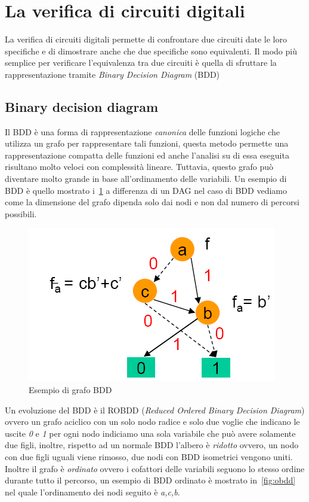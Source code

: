\section{La verifica di circuiti digitali}\label{capitolo6}
La verifica di circuiti digitali permette di confrontare due circuiti date le loro specifiche e di dimostrare anche che due specifiche sono equivalenti. Il modo più semplice per verificare l'equivalenza tra due circuiti è quella di sfruttare la rappresentazione tramite \emph{Binary Decision Diagram} (BDD)
\subsection{Binary decision diagram}
Il BDD è una forma di rappresentazione \emph{canonica} delle funzioni logiche che utilizza un grafo per rappresentare tali funzioni, questa metodo permette una rappresentazione compatta delle funzioni ed anche l'analisi su di essa eseguita risultano molto veloci con complessità lineare. Tuttavia, questo grafo può diventare molto grande in base all'ordinamento delle variabili.
Un esempio di BDD è quello mostrato i \figurename\,\ref{fig:bdd} a differenza di un DAG nel caso di BDD vediamo come la dimensione del grafo dipenda solo dai nodi e non dal numero di percorsi possibili.\\
\begin{figure}
\centering
\includegraphics[scale=0.5]{img/bdd.png}
\caption{Esempio di grafo BDD}\label{fig:bdd}
\end{figure}
Un evoluzione del BDD è il ROBDD (\emph{Reduced Ordered Binary Decision Diagram}) ovvero un grafo aciclico con un solo nodo radice e solo due voglie che indicano le uscite \emph{0} e \emph{1} per ogni nodo indiciamo una sola variabile che può avere solamente due figli, inoltre, rispetto ad un normale BDD l'albero è \emph{ridotto} ovvero, un nodo con due figli uguali viene rimosso, due nodi con BDD isometrici vengono uniti. Inoltre il grafo è \emph{ordinato} ovvero i cofattori delle variabili seguono lo stesso ordine durante tutto il percorso, un esempio di BDD ordinato è mostrato in \figurename\,\ref{fig:obdd} nel quale l'ordinamento dei nodi seguito è \emph{a,c,b}.\\
